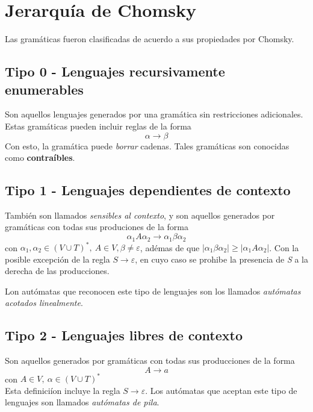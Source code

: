 \section{Jerarquía de Chomsky}
Las gramáticas fueron clasificadas de acuerdo a sus propiedades por Chomsky.

\subsection{Tipo 0 - Lenguajes recursivamente enumerables}

Son aquellos lenguajes generados por una gramática sin restricciones adicionales. Estas gramáticas pueden incluir reglas de la forma 
\[\alpha \rightarrow \beta\]
Con esto, la gramática puede \textit{borrar} cadenas. Tales gramáticas son conocidas como \textbf{contraíbles}.


\subsection{Tipo 1 - Lenguajes dependientes de contexto}
También son llamados \textit{sensibles al contexto}, y son aquellos generados por gramáticas con todas sus produciones de la forma
\[\alpha_1 A \alpha_2 \rightarrow \alpha_1 \beta \alpha_2\]
con $\alpha_1, \alpha_2 \in (V \cup T)^*,~ A \in V, \beta \neq \varepsilon$, adémas de que $| \alpha_1 \beta \alpha_2 | \ge |\alpha_1 A \alpha_2|$. Con la posible excepción de la regla $S \rightarrow \varepsilon$, en cuyo caso se prohibe la presencia de \textit{S} a la derecha de las producciones.

\vskip 0.2in

Lon autómatas que reconocen este tipo de lenguajes son los llamados \textit{autómatas acotados linealmente}.


\subsection{Tipo 2 - Lenguajes libres de contexto}
Son aquellos generados por gramáticas con todas sus producciones de la forma 
\[A \rightarrow a\]
con $A \in V,~ \alpha \in (V \cup T)^*$\\
Esta definiciíon incluye la regla $S \rightarrow \varepsilon$. Los autómatas que aceptan este tipo de lenguajes son llamados \textit{autómatas de pila}.

